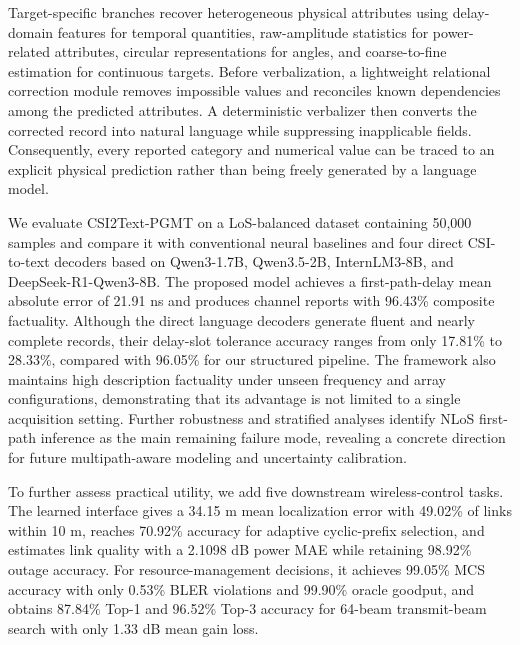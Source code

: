 \documentclass[conference]{IEEEtran}
\begin{document}
Target-specific branches recover heterogeneous physical attributes using delay-domain features for
temporal quantities, raw-amplitude statistics for power-related attributes, circular representations for
angles, and coarse-to-fine estimation for continuous targets. Before verbalization, a lightweight
relational correction module removes impossible values and reconciles known dependencies among the
predicted attributes. A deterministic verbalizer then converts the corrected record into natural
language while suppressing inapplicable fields. Consequently, every reported category and numerical
value can be traced to an explicit physical prediction rather than being freely generated by a language
model.

We evaluate CSI2Text-PGMT on a LoS-balanced dataset containing 50,000 samples and compare it
with conventional neural baselines and four direct CSI-to-text decoders based on Qwen3-1.7B,
Qwen3.5-2B, InternLM3-8B, and DeepSeek-R1-Qwen3-8B. The proposed model achieves a
first-path-delay mean absolute error of 21.91 ns and produces channel reports with 96.43\% composite
factuality. Although the direct language decoders generate fluent and nearly complete records, their
delay-slot tolerance accuracy ranges from only 17.81\% to 28.33\%, compared with 96.05\% for our
structured pipeline. The framework also maintains high description factuality under unseen frequency
and array configurations, demonstrating that its advantage is not limited to a single acquisition setting.
Further robustness and stratified analyses identify NLoS first-path inference as the main remaining
failure mode, revealing a concrete direction for future multipath-aware modeling and uncertainty
calibration.

To further assess practical utility, we add five downstream wireless-control tasks. The learned
interface gives a 34.15 m mean localization error with 49.02\% of links within 10 m, reaches
70.92\% accuracy for adaptive cyclic-prefix selection, and estimates link quality with a 2.1098 dB
power MAE while retaining 98.92\% outage accuracy. For resource-management decisions, it achieves
99.05\% MCS accuracy with only 0.53\% BLER violations and 99.90\% oracle goodput, and obtains
87.84\% Top-1 and 96.52\% Top-3 accuracy for 64-beam transmit-beam search with only 1.33 dB mean
gain loss.
\end{document}
